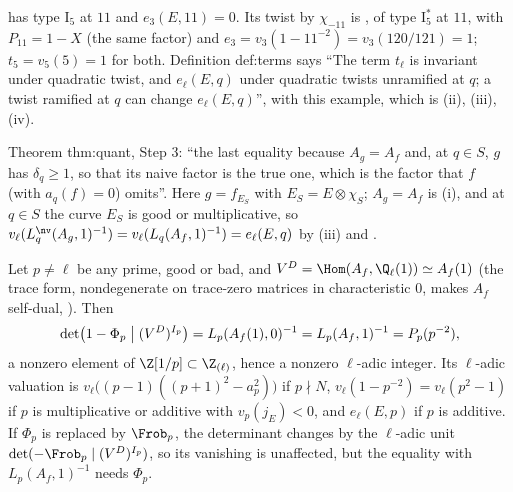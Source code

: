 \begin{example}\label{ex:lfunctions:twist-11}
 has type $\mathrm I_5$ at $11$ and $e_3(E,11)=0$. Its twist by $\chi_{-11}$ is , of type $\mathrm I_5^*$ at $11$, with $P_{11}=1-X$ (the same factor) and
$e_3=v_3(1-11^{-2})=v_3(120/121)=1$; $t_5=v_5(5)=1$ for both. Definition def:terms says ``The term $t_\ell$ is invariant under quadratic twist, and $e_\ell(E,q)$ under quadratic twists
unramified at $q$; a twist ramified at $q$ can change $e_\ell(E,q)$'', with this example, which is (ii), (iii), (iv).
\end{example}

\begin{paperlink}
Theorem thm:quant, Step 3: ``the last equality because $A_g=A_f$ and, at $q\in S$, $g$ has $\delta_q\ge1$, so that its naive factor is the true one, which is the factor that
$f$ (with $a_q(f)=0$) omits''. Here $g=f_{E_S}$ with $E_S=E\otimes\chi_S$; $A_g=A_f$ is (i), and at $q\in S$ the curve $E_S$ is good or multiplicative, so
$v_\ell(L_q^{\nv}(A_g,1)^{-1})=v_\ell(L_q(A_f,1)^{-1})=e_\ell(E,q)$ by (iii) and .
\end{paperlink}

\begin{proposition}\label{prop:lfunctions:fpr-L-part}
Let $p\ne\ell$ be any prime, good or bad, and $V^D=\Hom(A_f,\Q_\ell(1))\simeq A_f(1)$ (the trace form, nondegenerate on trace-zero matrices in characteristic $0$, makes $A_f$
self-dual, ). Then
\[
\det\bigl(1-\Phi_p\bigm|(V^D)^{I_p}\bigr)=L_p(A_f(1),0)^{-1}=L_p(A_f,1)^{-1}=P_p(p^{-2}),
\]
a nonzero element of $\Z[1/p]\subset\Z_{(\ell)}$, hence a nonzero $\ell$-adic integer. Its $\ell$-adic valuation is $v_\ell\bigl((p-1)((p+1)^2-a_p^2)\bigr)$ if $p\nmid N$,
$v_\ell(1-p^{-2})=v_\ell(p^2-1)$ if $p$ is multiplicative or additive with $v_p(j_E)<0$, and $e_\ell(E,p)$ if $p$ is additive. If $\Phi_p$ is
replaced by $\Frob_p$, the determinant changes by the $\ell$-adic unit $\det(-\Frob_p\mid(V^D)^{I_p})$, so its vanishing is unaffected, but the equality with $L_p(A_f,1)^{-1}$ needs
$\Phi_p$.
\end{proposition}

